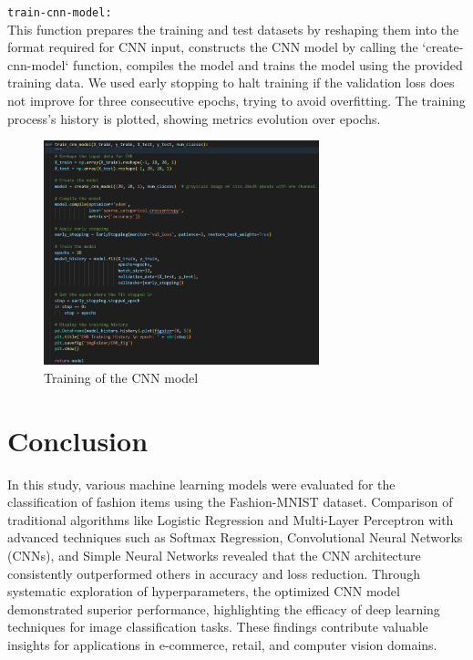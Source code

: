 \documentclass{article}
\newcommand{\code}[1]{\colorbox{light-gray}{\texttt{#1}}}
\begin{document}
\code{train-cnn-model:}\\\newline
This function prepares the training and test datasets by reshaping them into the format
required for CNN input, constructs the CNN model by calling the `create-cnn-model` function,
compiles the model and trains the model using the provided training data.
We used early stopping to halt training if the validation loss does not improve for three consecutive epochs,
trying to avoid overfitting.
The training process's history is plotted, showing metrics evolution over epochs.
\begin{figure}[H]
\caption{Training of the CNN model}
\centering
\includegraphics[width=8cm]{imgFolder/train_cnn_model.png}
\end{figure}
\section{Conclusion}
In this study, various machine learning models were evaluated for the classification of fashion items using the Fashion-MNIST dataset. Comparison of traditional algorithms like Logistic Regression and Multi-Layer Perceptron with advanced techniques such as Softmax Regression, Convolutional Neural Networks (CNNs), and Simple Neural Networks revealed that the CNN architecture consistently outperformed others in accuracy and loss reduction. Through systematic exploration of hyperparameters, the optimized CNN model demonstrated superior performance, highlighting the efficacy of deep learning techniques for image classification tasks. These findings contribute valuable insights for applications in e-commerce, retail, and computer vision domains.
\end{document}

